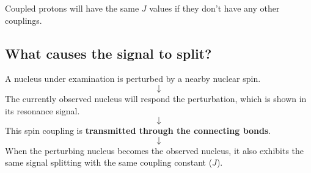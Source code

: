 \documentclass[11pt]{article}
\begin{document}
Coupled protons will have the same \(J\) values if they don't have any other couplings.

\newpage

\subsection{What causes the signal to split?}
\label{sec:org129d624}
A nucleus under examination is perturbed by a nearby nuclear spin.
\[\downarrow\]
The currently observed nucleus will respond the perturbation, which is shown in its resonance signal.
\[\downarrow\]
This spin coupling is \textbf{transmitted through the connecting bonds}.
\[\downarrow\]
When the perturbing nucleus becomes the observed nucleus, it also exhibits the same signal splitting with the same coupling constant (\(J\)).
\end{document}
